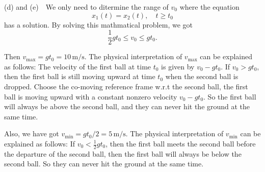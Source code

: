 \documentclass{article}
\begin{document}
\begin{solution}
(d) and (e)\ \ We only need to ditermine the range of $ v_0 $ where the equation
\[ x_1(t)=x_2(t),\quad t\ge t_0 \] 
has a solution. By solving this mathmatical problem, we got
\[ \frac{1}{2}gt_0\le v_0\le gt_0. \] \par 
Then $ \boxed{v_\mathrm{max}=gt_0=10\,\mathrm{m/s}} $. The physical interpretation of \(v_{\mathrm{max}}\) can be explained as follows: The velocity of the first ball at time \(t_0\) is given by \(v_0 - gt_0\). If \(v_0 > gt_0\), then the first ball is still moving upward at time \(t_0\) when the second ball is dropped. Choose the co-moving reference frame w.r.t the second ball, the first ball is moving upward with a constant nonzero velocity $ v_0-gt_0 $. So the first ball will always be above the second ball, and they can never hit the ground at the same time.\par 
Also, we have got $ \boxed{v_\mathrm{min}=gt_0/2=5\, \mathrm{m/s}} $. The physical interpretation of $ v_{\mathrm{min}} $ can be explained as follows: If $ v_0 < \frac{1}{2}gt_0 $, then the first ball meets the second ball before the departure of the second ball, then the first ball will always be below the second ball. So they can never hit the ground at the same time.
\end{solution}
\end{document}
